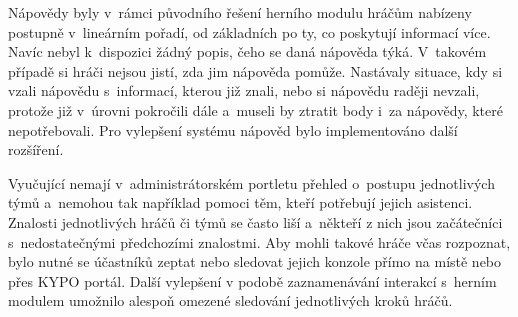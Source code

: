 \documentclass[
  digital, %
  oneside, %
  table,   %
  nolof,     %
  nolot,     %
]{fithesis3}
\begin{document}
Nápovědy byly v~rámci původního řešení herního modulu hráčům nabízeny postupně v~lineárním pořadí, od základních po ty, co poskytují informací více. Navíc nebyl k~dispozici žádný popis, čeho se daná nápověda týká. V~takovém případě si hráči nejsou jistí, zda jim nápověda pomůže. Nastávaly situace, kdy si vzali nápovědu s~informací, kterou již znali, nebo si nápovědu raději nevzali, protože již v~úrovni pokročili dále a~museli by ztratit body i~za nápovědy, které nepotřebovali. Pro vylepšení systému nápověd bylo implementováno další rozšíření.\par
Vyučující nemají v~administrátorském portletu přehled o~postupu jednotlivých týmů a~nemohou tak například pomoci těm, kteří potřebují jejich asistenci. Znalosti jednotlivých hráčů či týmů se často liší a~někteří z nich jsou začátečníci s~nedostatečnými předchozími znalostmi. Aby mohli takové hráče včas rozpoznat, bylo nutné se účastníků zeptat nebo sledovat jejich konzole přímo na místě nebo přes KYPO portál. Další vylepšení v podobě zaznamenávání interakcí s~herním modulem umožnilo alespoň omezené sledování jednotlivých kroků hráčů. \cite{ctfDesign}
\end{document}
